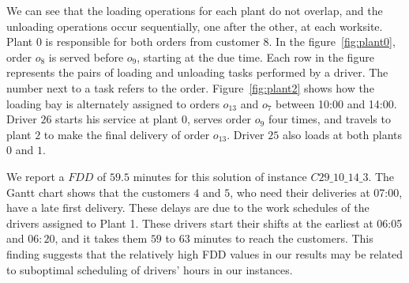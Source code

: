 We can see that the loading operations for each plant do not overlap, and the unloading operations occur sequentially, one after the other, at each worksite. Plant $0$ is responsible for both orders from customer $8$. In the figure~\ref{fig:plant0}, order $o_8$ is served before $o_9$, starting at the due time. Each row in the figure represents the pairs of loading and unloading tasks performed by a driver. The number next to a task refers to the order.  Figure~\ref{fig:plant2} shows how the loading bay is alternately assigned to orders $o_{13}$ and $o_7$ between 10:00 and 14:00. Driver $26$ starts his service at plant $0$, serves order $o_9$ four times, and travels to plant $2$ to make the final delivery of order $o_{13}$. Driver $25$ also loads at both plants $0$ and $1$.

We report a $FDD$ of $59.5$ minutes for this solution of instance $C29\_10\_14\_3$. The Gantt chart shows that the customers $4$ and $5$, who need their deliveries at 07:00, have a late first delivery. These delays are due to the work schedules of the drivers assigned to Plant 1. These drivers start their shifts at the earliest at 06:05 and $06:20$, and it takes them $59$ to $63$ minutes to reach the customers. This finding suggests that the relatively high FDD values in our results may be related to suboptimal scheduling of drivers' hours in our instances.

